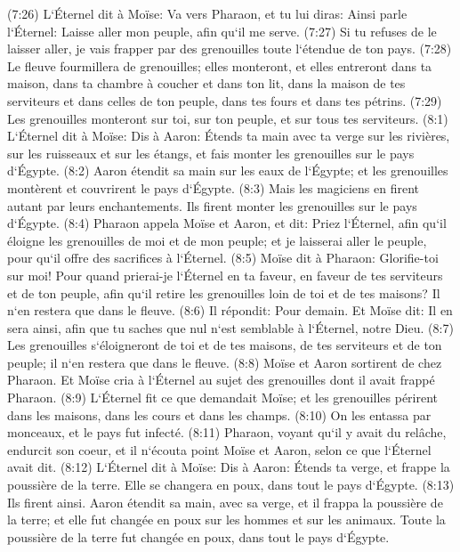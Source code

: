 \verse (7:26) L`Éternel dit à Moïse: Va vers Pharaon, et tu lui diras: Ainsi parle l`Éternel: Laisse aller mon peuple, afin qu`il me serve. 
\verse (7:27) Si tu refuses de le laisser aller, je vais frapper par des grenouilles toute l`étendue de ton pays. 
\verse (7:28) Le fleuve fourmillera de grenouilles; elles monteront, et elles entreront dans ta maison, dans ta chambre à coucher et dans ton lit, dans la maison de tes serviteurs et dans celles de ton peuple, dans tes fours et dans tes pétrins. 
\verse (7:29) Les grenouilles monteront sur toi, sur ton peuple, et sur tous tes serviteurs. 
\verse (8:1) L`Éternel dit à Moïse: Dis à Aaron: Étends ta main avec ta verge sur les rivières, sur les ruisseaux et sur les étangs, et fais monter les grenouilles sur le pays d`Égypte. 
\verse (8:2) Aaron étendit sa main sur les eaux de l`Égypte; et les grenouilles montèrent et couvrirent le pays d`Égypte. 
\verse (8:3) Mais les magiciens en firent autant par leurs enchantements. Ils firent monter les grenouilles sur le pays d`Égypte. 
\verse (8:4) Pharaon appela Moïse et Aaron, et dit: Priez l`Éternel, afin qu`il éloigne les grenouilles de moi et de mon peuple; et je laisserai aller le peuple, pour qu`il offre des sacrifices à l`Éternel. 
\verse (8:5) Moïse dit à Pharaon: Glorifie-toi sur moi! Pour quand prierai-je l`Éternel en ta faveur, en faveur de tes serviteurs et de ton peuple, afin qu`il retire les grenouilles loin de toi et de tes maisons? Il n`en restera que dans le fleuve. 
\verse (8:6) Il répondit: Pour demain. Et Moïse dit: Il en sera ainsi, afin que tu saches que nul n`est semblable à l`Éternel, notre Dieu. 
\verse (8:7) Les grenouilles s`éloigneront de toi et de tes maisons, de tes serviteurs et de ton peuple; il n`en restera que dans le fleuve. 
\verse (8:8) Moïse et Aaron sortirent de chez Pharaon. Et Moïse cria à l`Éternel au sujet des grenouilles dont il avait frappé Pharaon. 
\verse (8:9) L`Éternel fit ce que demandait Moïse; et les grenouilles périrent dans les maisons, dans les cours et dans les champs. 
\verse (8:10) On les entassa par monceaux, et le pays fut infecté. 
\verse (8:11) Pharaon, voyant qu`il y avait du relâche, endurcit son coeur, et il n`écouta point Moïse et Aaron, selon ce que l`Éternel avait dit. 
\verse (8:12) L`Éternel dit à Moïse: Dis à Aaron: Étends ta verge, et frappe la poussière de la terre. Elle se changera en poux, dans tout le pays d`Égypte. 
\verse (8:13) Ils firent ainsi. Aaron étendit sa main, avec sa verge, et il frappa la poussière de la terre; et elle fut changée en poux sur les hommes et sur les animaux. Toute la poussière de la terre fut changée en poux, dans tout le pays d`Égypte. 
